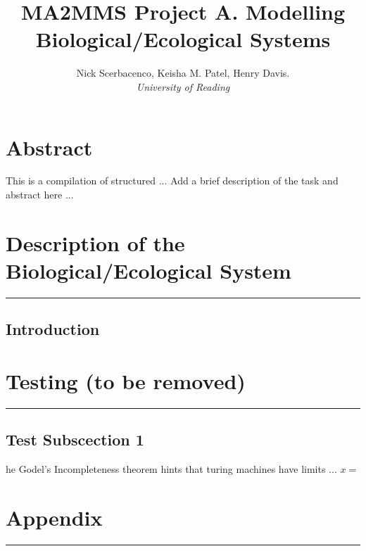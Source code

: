 \documentclass[11pt]{article}
\title{\textbf{MA2MMS Project A. Modelling Biological/Ecological Systems}}
\author{Nick Scerbacenco, Keisha M. Patel, Henry Davis. \\
        \textit{University of Reading}}
\date{ }
\begin{document}
\pagestyle{fancy}


\maketitle
\thispagestyle{empty} 

\section*{\textbf{Abstract}}
This is a compilation of structured ... Add a brief description of the task and abstract here ...

\tableofcontents

\newpage


\section{Description of the Biological/Ecological System}
\hrule height 0.8pt 
\vspace{5mm}

\subsection{Introduction}


\newpage
\section{Testing (to be removed)}
\hrule height 0.8pt 
\vspace{5mm}

\subsection{Test Subscection 1}

\lettrine[findent=2pt]{}{ } he Godel's Incompleteness theorem hints that turing machines have limits ...
$x =$

\newpage 
\section*{Appendix}
\hrule height 0.8pt 
\vspace{5mm}


\end{document}
